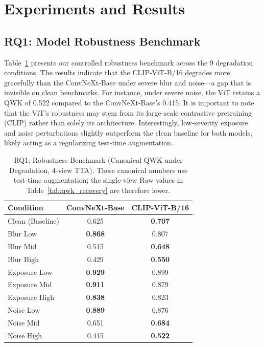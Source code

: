 \documentclass[runningheads]{llncs}
\begin{document}
\section{Experiments and Results}

\subsection{RQ1: Model Robustness Benchmark}
Table~\ref{tab:rq1_robustness} presents our controlled robustness benchmark across the 9 degradation conditions. The results indicate that the CLIP-ViT-B/16 degrades more gracefully than the ConvNeXt-Base under severe blur and noise---a gap that is invisible on clean benchmarks. For instance, under severe noise, the ViT retains a QWK of 0.522 compared to the ConvNeXt-Base's 0.415. It is important to note that the ViT's robustness may stem from its large-scale contrastive pretraining (CLIP) rather than solely its architecture. Interestingly, low-severity exposure and noise perturbations slightly outperform the clean baseline for both models, likely acting as a regularizing test-time augmentation.

\begin{table}[!t]
\caption{RQ1: Robustness Benchmark (Canonical QWK under Degradation, 4-view TTA). These canonical numbers use test-time augmentation; the single-view Raw values in Table~\ref{tab:qwk_recovery} are therefore lower.}
\label{tab:rq1_robustness}
\begin{center}
\begin{tabular}{lcc}
\toprule
\textbf{Condition} & \textbf{ConvNeXt-Base} & \textbf{CLIP-ViT-B/16} \\
\midrule
Clean (Baseline) & 0.625 & \textbf{0.707} \\
\midrule
Blur Low & \textbf{0.868} & 0.807 \\
Blur Mid & 0.515 & \textbf{0.648} \\
Blur High & 0.429 & \textbf{0.550} \\
\midrule
Exposure Low & \textbf{0.929} & 0.899 \\
Exposure Mid & \textbf{0.911} & 0.879 \\
Exposure High & \textbf{0.838} & 0.823 \\
\midrule
Noise Low & \textbf{0.889} & 0.876 \\
Noise Mid & 0.651 & \textbf{0.684} \\
Noise High & 0.415 & \textbf{0.522} \\
\bottomrule
\end{tabular}
\end{center}
\end{table}
\end{document}
